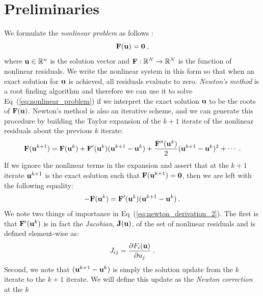 \section{Preliminaries\ }
\label{sec:nonlinear_preliminaries}
We formulate the \textit{nonlinear problem} as follows
\citep{knoll_jacobian-free_2004}:
\begin{equation}
  \mathbf{F}(\mathbf{u}) = \mathbf{0}\:,
  \label{eq:nonlinear_problem}
\end{equation}
where $\mathbf{u} \in \mathbb{R}^n$ is the solution vector and
$\mathbf{F}:\mathbb{R}^N \rightarrow \mathbb{R}^N$ is the function of
nonlinear residuals. We write the nonlinear system in this form so
that when an exact solution for $\mathbf{u}$ is achieved, all residuals
evaluate to zero. \textit{Newton's method} is a root finding algorithm
and therefore we can use it to solve Eq~(\ref{eq:nonlinear_problem})
if we interpret the exact solution $\mathbf{u}$ to be the roots of
$\mathbf{F}(\mathbf{u})$. Newton's method is also an iterative scheme, and we
can generate this procedure by building the Taylor expansion of the
$k+1$ iterate of the nonlinear residuals about the previous $k$
iterate:
\begin{equation}
  \mathbf{F}(\mathbf{u}^{k+1}) = \mathbf{F}(\mathbf{u}^{k}) +
  \mathbf{F}'(\mathbf{u}^{k})(\mathbf{u}^{k+1}-\mathbf{u}^{k}) +
  \frac{\mathbf{F}''(\mathbf{u}^{k})}{2}(\mathbf{u}^{k+1}-\mathbf{u}^{k})^2 + \cdots
  \:.
  \label{eq:newton_derivation_1}
\end{equation}
If we ignore the nonlinear terms in the expansion and assert that at
the $k+1$ iterate $\mathbf{u}^{k+1}$ is the exact solution such that
$\mathbf{F}(\mathbf{u}^{k+1}) = \mathbf{0}$, then we are left with the following
equality:
\begin{equation}
  -\mathbf{F}(\mathbf{u}^{k}) =
  \mathbf{F}'(\mathbf{u}^{k})(\mathbf{u}^{k+1}-\mathbf{u}^{k})\:.
  \label{eq:newton_derivation_2}
\end{equation}
We note two things of importance in
Eq~(\ref{eq:newton_derivation_2}). The first is that
$\mathbf{F}'(\mathbf{u}^{k})$ is in fact the \textit{Jacobian},
$\mathbf{J}(\mathbf{u})$, of the set of nonlinear residuals and is defined
element-wise as:
\begin{equation}
  J_{ij} = \frac{\partial F_i(\mathbf{u})}{\partial u_j}\:.
  \label{eq:jacobian_def}
\end{equation}
Second, we note that $(\mathbf{u}^{k+1}-\mathbf{u}^{k})$ is simply the
solution update from the $k$ iterate to the $k+1$ iterate. We will
define this update as the \textit{Newton correction} at the $k$

